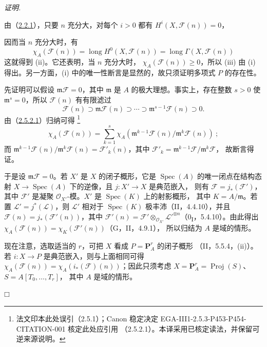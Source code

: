 \documentclass[UTF8,fontset=none,11pt,oneside,openany]{ctexbook}
\providecommand{\square}{\mdlgwhtsquare}
\newcommand{\SourceCorrectionNote}[1]{\footnote{#1}}
\newenvironment{proof}{%
  \par\smallskip\noindent\textit{证明.}\ %
}{\hfill$\square$\par}
\newcommand{\oldpage}[2][]{%
  \hypertarget{ega-source-page-#1-#2}{}%
  \marginnote{\scriptsize\textbf{#1}~|~#2}\ignorespaces}
\begin{document}
\begin{proof}
由（\hyperref[III.2.2.1-fr]{2.2.1}），只要 $n$ 充分大，对每个 $i>0$
都有 $H^i(X,\mathcal F(n))=0$，

\oldpage[III]{110}
因而当 $n$ 充分大时，有
\[
\chi_A(\mathcal F(n))=\operatorname{long}H^0(X,\mathcal F(n))
=\operatorname{long}\Gamma(X,\mathcal F(n))
\]
这就得到 (ii)。它还表明，当 $n$ 充分大时，
$\chi_A(\mathcal F(n))\geq0$，所以 (iii) 由 (i) 得出。另一方面，(i)
中的唯一性断言是显然的，故只须证明多项式 $P$ 的存在性。

先证明可以假设 $\mathfrak m\mathcal F=0$，其中 $\mathfrak m$ 是 $A$
的极大理想。事实上，存在整数 $s>0$ 使 $\mathfrak m^s=0$，所以
$\mathcal F(n)$ 有有限滤过
\[
\mathcal F(n)\supset\mathfrak m\mathcal F(n)\supset\cdots
\supset\mathfrak m^{s-1}\mathcal F(n)\supset0.
\]
由（\hyperref[III.2.5.2.1-fr]{2.5.2.1}）归纳可得
\SourceCorrectionNote{法文印本此处误引（2.5.1）；Canon 稳定决定
EGA-III1-2.5.3-P453-P454-CITATION-001 核定此处应引用
（2.5.2.1）。本译采用已核定读法，并保留可逆来源说明。}
\[
\chi_A(\mathcal F(n))=\sum_{k=1}^{s}
\chi_A(\mathfrak m^{k-1}\mathcal F(n)/\mathfrak m^k\mathcal F(n))~;
\]
而
$\mathfrak m^{k-1}\mathcal F(n)/\mathfrak m^k\mathcal F(n)
=\mathcal F'_k(n)$，其中
$\mathcal F'_k=\mathfrak m^{k-1}\mathcal F/\mathfrak m^k\mathcal F$，
故断言得证。

于是设 $\mathfrak m\mathcal F=0$。若 $X'$ 是 $X$ 的闭子概形，它是
$\operatorname{Spec}(A)$ 的唯一闭点在结构态射
$X\to\operatorname{Spec}(A)$ 下的逆像，且 $j:X'\to X$ 是典范嵌入，
则有 $\mathcal F=j_*(\mathcal F')$，其中 $\mathcal F'$ 是凝聚
$\mathcal O_{X'}$-模。$X'$ 是 $\operatorname{Spec}(K)$ 上的射影概形，
其中 $K=A/\mathfrak m$。若置 $\mathcal L'=j^*(\mathcal L)$，则
$\mathcal L'$ 相对于 $\operatorname{Spec}(K)$ 极丰沛（II，4.4.10），并且
$\mathcal F(n)=j_*(\mathcal F'(n))$，其中
$\mathcal F'(n)=\mathcal F'\otimes_{\mathcal O_{X'}}
\mathcal L'^{\otimes n}$（0\textsubscript{I}，5.4.10）。由此得出
$\chi_A(\mathcal F(n))=\chi_K(\mathcal F'(n))$（G，II，4.9.1），
所以归结为 $A$ 是域的情形。

现在注意，选取适当的 $r$，可把 $X$ 看成 $P=\mathbf P_A^r$ 的闭子概形
（II，5.5.4，(ii)）。若 $i:X\to P$ 是典范嵌入，则与上面相同可得
$\chi_A(\mathcal F(n))=\chi_A(i_*(\mathcal F)(n))$；因此只须考虑
$X=\mathbf P_A^r=\operatorname{Proj}(S)$、$S=A[T_0,\ldots,T_r]$，
其中 $A$ 是域的情形。


\end{proof}
\end{document}
